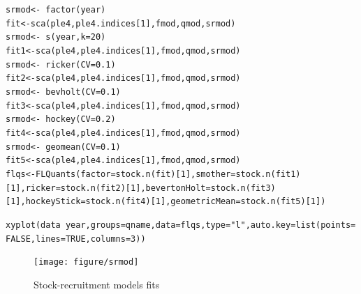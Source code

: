\documentclass[a4paper,english,10pt]{article}\usepackage[]{graphicx}\usepackage[]{color}
\makeatletter
\newcommand{\hlnum}[1]{\textcolor[rgb]{0.2,0.2,0.2}{#1}}%
\newcommand{\hlstr}[1]{\textcolor[rgb]{0.2,0.2,0.2}{#1}}%
\newcommand{\hlopt}[1]{\textcolor[rgb]{0.2,0.2,0.2}{#1}}%
\newcommand{\hlstd}[1]{\textcolor[rgb]{0,0,0}{#1}}%
\newcommand{\hlkwb}[1]{\textcolor[rgb]{0.361,0.506,0.596}{#1}}%
\newcommand{\hlkwc}[1]{\textcolor[rgb]{0.361,0.506,0.596}{#1}}%
\newcommand{\hlkwd}[1]{\textcolor[rgb]{0.361,0.506,0.596}{#1}}%
\newenvironment{kframe}{%
 \def\at@end@of@kframe{}%
 \ifinner\ifhmode%
  \def\at@end@of@kframe{\end{minipage}}%
  \begin{minipage}{\columnwidth}%
 \fi\fi%
 \def\FrameCommand##1{\hskip\@totalleftmargin \hskip-\fboxsep
 \colorbox{shadecolor}{##1}\hskip-\fboxsep
     \hskip-\linewidth \hskip-\@totalleftmargin \hskip\columnwidth}%
 \MakeFramed {\advance\hsize-\width
   \@totalleftmargin\z@ \linewidth\hsize
   \@setminipage}}%
 {\par\unskip\endMakeFramed%
 \at@end@of@kframe}
\newenvironment{knitrout}{}{} %
\makeatother
\begin{document}
\begin{knitrout}
\color{fgcolor}\begin{kframe}
\begin{alltt}
\hlstd{srmod} \hlkwb{<-} \hlopt{~} \hlkwd{factor}\hlstd{(year)}
\hlstd{fit} \hlkwb{<-} \hlkwd{sca}\hlstd{(ple4, ple4.indices[}\hlnum{1}\hlstd{], fmod, qmod, srmod)}
\hlstd{srmod} \hlkwb{<-} \hlopt{~} \hlkwd{s}\hlstd{(year,} \hlkwc{k}\hlstd{=}\hlnum{20}\hlstd{)}
\hlstd{fit1} \hlkwb{<-} \hlkwd{sca}\hlstd{(ple4, ple4.indices[}\hlnum{1}\hlstd{], fmod, qmod, srmod)}
\hlstd{srmod} \hlkwb{<-} \hlopt{~} \hlkwd{ricker}\hlstd{(}\hlkwc{CV}\hlstd{=}\hlnum{0.1}\hlstd{)}
\hlstd{fit2} \hlkwb{<-} \hlkwd{sca}\hlstd{(ple4, ple4.indices[}\hlnum{1}\hlstd{], fmod, qmod, srmod)}
\hlstd{srmod} \hlkwb{<-} \hlopt{~} \hlkwd{bevholt}\hlstd{(}\hlkwc{CV}\hlstd{=}\hlnum{0.1}\hlstd{)}
\hlstd{fit3} \hlkwb{<-} \hlkwd{sca}\hlstd{(ple4, ple4.indices[}\hlnum{1}\hlstd{], fmod, qmod, srmod)}
\hlstd{srmod} \hlkwb{<-} \hlopt{~} \hlkwd{hockey}\hlstd{(}\hlkwc{CV}\hlstd{=}\hlnum{0.2}\hlstd{)}
\hlstd{fit4} \hlkwb{<-} \hlkwd{sca}\hlstd{(ple4, ple4.indices[}\hlnum{1}\hlstd{], fmod, qmod, srmod)}
\hlstd{srmod} \hlkwb{<-} \hlopt{~} \hlkwd{geomean}\hlstd{(}\hlkwc{CV}\hlstd{=}\hlnum{0.1}\hlstd{)}
\hlstd{fit5} \hlkwb{<-} \hlkwd{sca}\hlstd{(ple4, ple4.indices[}\hlnum{1}\hlstd{], fmod, qmod, srmod)}
\hlstd{flqs} \hlkwb{<-} \hlkwd{FLQuants}\hlstd{(}\hlkwc{factor}\hlstd{=}\hlkwd{stock.n}\hlstd{(fit)[}\hlnum{1}\hlstd{],} \hlkwc{smother}\hlstd{=}\hlkwd{stock.n}\hlstd{(fit1)[}\hlnum{1}\hlstd{],} \hlkwc{ricker}\hlstd{=}\hlkwd{stock.n}\hlstd{(fit2)[}\hlnum{1}\hlstd{],} \hlkwc{bevertonHolt}\hlstd{=}\hlkwd{stock.n}\hlstd{(fit3)[}\hlnum{1}\hlstd{],} \hlkwc{hockeyStick}\hlstd{=}\hlkwd{stock.n}\hlstd{(fit4)[}\hlnum{1}\hlstd{],} \hlkwc{geometricMean}\hlstd{=}\hlkwd{stock.n}\hlstd{(fit5)[}\hlnum{1}\hlstd{])}
\end{alltt}
\end{kframe}
\end{knitrout}

\begin{knitrout}
\color{fgcolor}\begin{kframe}
\begin{alltt}
\hlkwd{xyplot}\hlstd{(data}\hlopt{~}\hlstd{year,} \hlkwc{groups}\hlstd{=qname,} \hlkwc{data}\hlstd{=flqs,} \hlkwc{type}\hlstd{=}\hlstr{"l"}\hlstd{,} \hlkwc{auto.key}\hlstd{=}\hlkwd{list}\hlstd{(}\hlkwc{points}\hlstd{=}\hlnum{FALSE}\hlstd{,} \hlkwc{lines}\hlstd{=}\hlnum{TRUE}\hlstd{,} \hlkwc{columns}\hlstd{=}\hlnum{3}\hlstd{))}
\end{alltt}
\end{kframe}\begin{figure}[H]


{\centering \texttt{[image: figure/srmod]} 

}

\caption[Stock-recruitment models fits]{Stock-recruitment models fits\label{fig:srmod}}
\end{figure}


\end{knitrout}
\end{document}
